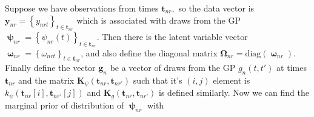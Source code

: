 \documentclass{article}
\newcommand{\1}{\mathbf{1}}
\newcommand{\0}{\mathbf{0}}
\newcommand{\K}{\mathbf{K}}
\newcommand{\g}{\mathbf{g}}
\newcommand{\y}{\mathbf{y}}
\begin{document}
%
%
Suppose we have observations from times $\mathbf{t}_{nr},$ so the data vector is $\y_{nr} = \left\{ y_{nrt} \right\}_{t\in\mathbf{t}_{nr}}$ which is associated with draws from the GP $\bm{\uppsi}_{nr} = \left\{ \psi_{nr}(t) \right\}_{t\in\mathbf{t}_{nr}}$. Then there is the latent variable vector $\bm{\upomega}_{nr} = \left\{ \omega_{nrt} \right\}_{t\in\mathbf{t}_{nr}}$, and also define the diagonal matrix $\bm{\Omega}_{nr} = \text{diag}\left( \bm{\upomega}_{nr} \right).$ Finally define the vector $\g_n$ be a vector of draws from the GP $g_n(t, t')$ at times $\mathbf{t}_{nr}$ and the matrix $\K_\psi(\mathbf{t}_{nr}, \mathbf{t}_{nr'})$ such that it's $(i, j)$ element is $k_\psi(\mathbf{t}_{nr}[i], \mathbf{t}_{nr'}[j])$ and $\K_g(\mathbf{t}_{nr}, \mathbf{t}_{nr'})$ is defined similarly. Now we can find the marginal prior of distribution of $\bm{\uppsi}_{nr} $ with 
\end{document}
